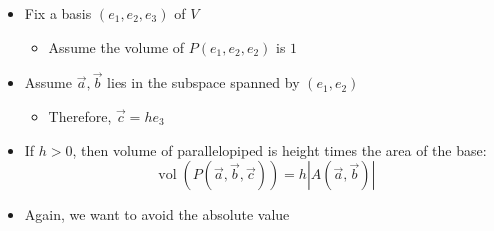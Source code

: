 \documentclass[usenames,dvipsnames,10pt]{beamer}
\newcommand\vol{\operatorname{vol}}
\begin{document}
\begin{frame}
  \begin{itemize}
  \item Fix a basis $(e_1,e_2,e_3)$ of $V$
    \begin{itemize}
    \item Assume the volume of $P(e_1,e_2,e_2)$ is $1$
    \end{itemize}
  \item Assume $\vec{a}, \vec{b}$ lies in the subspace spanned by $(e_1,e_2)$
    \begin{itemize}
    \item Therefore, $\vec{c} = he_3$
    \end{itemize}
  \item If $h > 0$, then volume of parallelopiped is height times the area of the base:
    \[
      \vol(P(\vec{a},\vec{b},\vec{c})) = h|A(\vec{a},\vec{b})|
    \]
  \item Again, we want to avoid the absolute value
  \end{itemize}
\end{frame}
\end{document}
